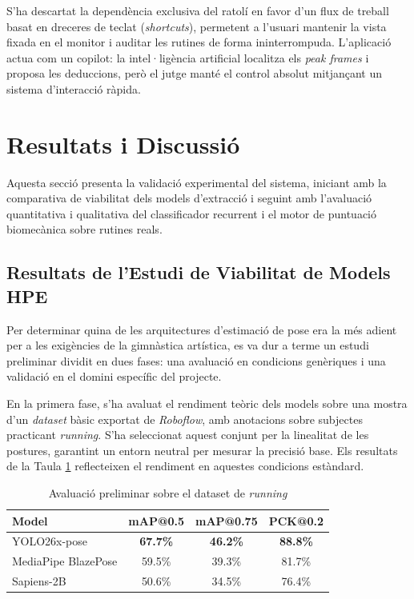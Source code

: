 \documentclass[10pt,a4paper,twocolumn,twoside]{article}
\begin{document}
S'ha descartat la dependència exclusiva del ratolí en favor d'un flux de treball basat en dreceres de teclat (\textit{shortcuts}), permetent a l'usuari mantenir la vista fixada en el monitor i auditar les rutines de forma ininterrompuda. L'aplicació actua com un copilot: la intel·ligència artificial localitza els \textit{peak frames} i proposa les deduccions, però el jutge manté el control absolut mitjançant un sistema d'interacció ràpida.

\section{Resultats i Discussió}
Aquesta secció presenta la validació experimental del sistema, iniciant amb la comparativa de viabilitat dels models d'extracció i seguint amb l'avaluació quantitativa i qualitativa del classificador recurrent i el motor de puntuació biomecànica sobre rutines reals.

\subsection{Resultats de l'Estudi de Viabilitat de Models HPE}
\label{sec:resultats_viabilitat}
Per determinar quina de les arquitectures d'estimació de pose era la més adient per a les exigències de la gimnàstica artística, es va dur a terme un estudi preliminar dividit en dues fases: una avaluació en condicions genèriques i una validació en el domini específic del projecte.

En la primera fase, s'ha avaluat el rendiment teòric dels models sobre una mostra d'un \textit{dataset} bàsic exportat de \textit{Roboflow}, amb anotacions sobre subjectes practicant \textit{running}. S'ha seleccionat aquest conjunt per la linealitat de les postures, garantint un entorn neutral per mesurar la precisió base. Els resultats de la Taula \ref{tab:avaluacio-running} reflecteixen el rendiment en aquestes condicions estàndard.

\begin{table}[H]
\centering
\caption{Avaluació preliminar sobre el dataset de \textit{running}}
\label{tab:avaluacio-running}
\renewcommand{\arraystretch}{1.2}
\setlength{\tabcolsep}{2pt}
\begin{tabular}{lccc}
\hline
\textbf{Model} & \textbf{mAP@0.5} & \textbf{mAP@0.75} & \textbf{PCK@0.2} \\ \hline
YOLO26x-pose & \textbf{67.7\%} & \textbf{46.2\%} & \textbf{88.8\%} \\
MediaPipe BlazePose & 59.5\% & 39.3\% & 81.7\% \\
Sapiens-2B & 50.6\% & 34.5\% & 76.4\% \\ \hline
\end{tabular}
\end{table}
\end{document}
